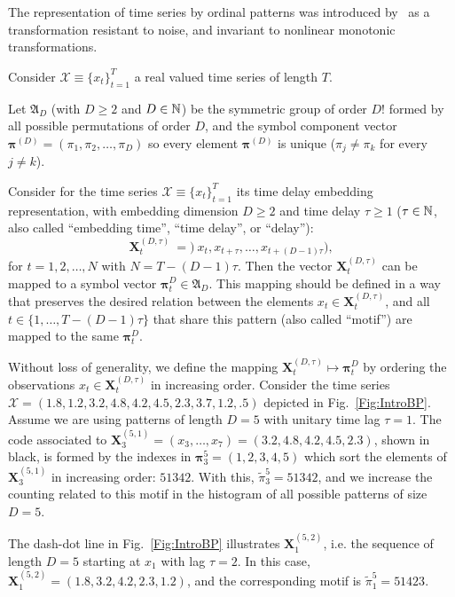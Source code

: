 \documentclass[paper=letter, fontsize=12pt]{article}
\begin{document}
The representation of time series by ordinal patterns was introduced by~\cite{Bandt2002Permutation} as a transformation resistant to noise, and invariant to nonlinear monotonic transformations.

Consider ${\mathcal X} \equiv \{x_t\}_{t=1}^{T}$ a real valued time series of length $T$. 

Let ${\mathfrak A}_{D}$ (with $D \geq 2$ and $D \in {\Bbb N}$) be the symmetric group of order $D!$ formed by all 
possible permutations of order $D$, and the symbol component vector 
${\bm \pi}^{(D)} = (\pi_1, \pi_2, \dots, \pi_D)$ so every element ${\bm \pi}^{(D)}$ is unique 
($\pi_j \neq \pi_k$ for every $j \neq k$). 

Consider for the time series ${\mathcal X} \equiv \{x_t\}_{t=1}^{T}$ its time delay embedding representation,
with embedding dimension $D \geq 2$ and time delay $\tau \geq 1$ ($\tau \in {\Bbb N}$, also called ``embedding time'', ``time delay'', or ``delay''):
\begin{equation} 
\label{eq:time-delay}
{\mathbf X}^{(D,\tau)}_t ~=)~ x_t,x_{t+\tau},\dots,x_{t+(D-1)\tau} ) ,
\end{equation} 
for $t = 1,2,\dots,N$ with $N = T-(D-1) \tau$.
Then the vector ${\mathbf X}^{(D,\tau)}_t$ can be mapped to a symbol vector ${\bm \pi}_t^D \in {\mathfrak A}_{D}$. 
This mapping should be defined in a way that preserves the desired relation between the elements 
$x_t  \in {\mathbf X}^{(D,\tau)}_t$, and all $t \in \{1,\dots,T-(D-1)\tau\}$ that share this pattern (also called ``motif'') are mapped to the same 
${\bm \pi}_t^{D}$.

Without loss of generality, we define the mapping ${\mathbf X}_t^{(D,\tau)} \mapsto {\mathbf \pi}_t^{D}$ by ordering the observations $x_t \in {\mathbf X}_t^{(D,\tau)}$ in increasing order.
Consider the time series $\mathcal X = (1.8, 1.2, 3.2, 4.8, 4.2, 4.5, 2.3, 3.7, 1.2, .5)$ depicted in Fig.~\ref{Fig:IntroBP}.
Assume we are using patterns of length $D=5$ with unitary time lag $\tau=1$.
The code associated to $\mathbf X_{3}^{(5,1)}=(x_3,\dots,x_7)=(3.2, 4.8, 4.2, 4.5, 2.3)$, shown in black, is formed by the indexes in $\bm\pi_3^{5}=(1,2,3,4,5)$ which sort the elements of $\mathbf X_{3}^{(5,1)}$ in increasing order: $51342$.
With this, $\widetilde{\pi}_3^{5} = 51342$, and we increase the counting related to this motif in the histogram of all possible patterns of size $D=5$.

The dash-dot line in Fig.~\ref{Fig:IntroBP} illustrates $\mathbf X_{1}^{(5,2)}$, i.e. the sequence of length $D=5$ starting at $x_1$ with lag $\tau=2$.
In this case, $\mathbf X_{1}^{(5,2)}= (1.8, 3.2, 4.2, 2.3, 1.2)$, and the corresponding motif is $\widetilde{\pi}_1^{5}=51423$.
\end{document}
